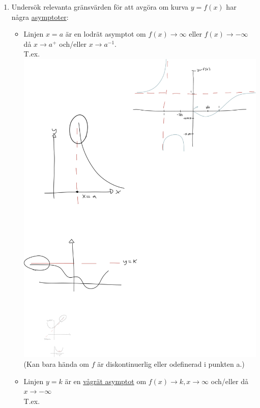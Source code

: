\documentclass{article}
\begin{document}
\begin{enumerate}
  \item Undersök relevanta gränsvärden för att avgöra om kurva $y=f(x)$ har några \uline{asymptoter}:
  \begin{itemize}
    \item Linjen $x=a$ är en lodrät asymptot om $f(x)\to\infty$ eller $f(x)\to-\infty$ då $x\to a^+$ och/eller $x\to a^{-1}$.\\
      T.ex.\\
      \includegraphics[scale=0.2]{img/asym1.pdf}\\
      (Kan bara hända om $f$ är diskontinuerlig eller odefinerad i punkten a.)
    \item Linjen $y=k$ är en \uline{vågrät asymptot} om $f(x)\to k, x\to\infty$ och/eller då $x\to -\infty$\\
      T.ex.\\

\end{itemize}
\end{enumerate}
\end{document}
